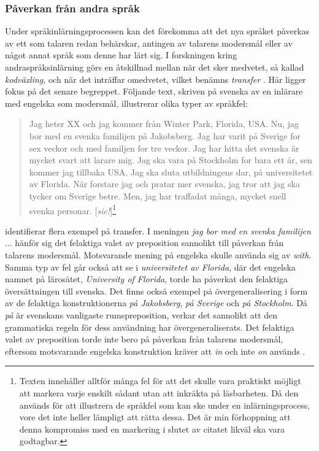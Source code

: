 \documentclass[12pt,a4paper]{article}
\begin{document}
\subsubsection{Påverkan från andra språk}
\label{subsec:Bakgrund: Språkfel: Påverkan från andra språk}
Under språkinlärningsprocessen kan det förekomma att det nya språket påverkas av ett som talaren redan behärskar, antingen av talarens modersmål eller av något annat språk som denne har lärt sig. I forskningen kring andraspråksinlärning görs en åtskillnad mellan när det sker medvetet, så kallad \emph{kodväxling}, och när det inträffar omedvetet, vilket benämns \emph{transfer} \autocite{viberg1987}. Här ligger fokus på det senare begreppet. Följande text, skriven på svenska av en inlärare med engelska som modersmål, illustrerar olika typer av språkfel:

\blockquote[{\cite[50]{viberg1987}}]{Jag heter XX och jag kommer från Winter Park, Florida, USA. Nu, jag bor med en svenka familijen på Jakobsberg. Jag har varit på Sverige for sex veckor och med familjen for tre veckor. Jag har hitta det svenska är mycket svart att larare mig. Jag ska vara på Stockholm for bara ett år, sen kommer jag tillbaka USA. Jag ska sluta utbildningens dar, på universitetet av Florida. När forstare jag och pratar mer svenska, jag tror att jag ska tycker om Sverige betre. Men, jag har traffadat många, mycket snell svenka personar. [\emph{sic!}]\footnote{Texten innehåller alltför många fel för att det skulle vara praktiskt möjligt att markera varje enskilt sådant utan att inkräkta på läsbarheten. Då den används för att illustrera de språkfel som kan ske under en inlärningsprocess, vore det inte heller lämpligt att rätta dessa. Det är min förhoppning att denna kompromiss med en markering i slutet av citatet likväl ska vara godtagbar.}}

\noindent
\textcite{viberg1987} identifierar flera exempel på transfer. I meningen \emph{jag bor med en svenka familijen} ... hänför sig det felaktiga valet av preposition sannolikt till påverkan från talarens modersmål. Motsvarande mening på engelska skulle använda sig av \emph{with}. Samma typ av fel går också att se i \emph{universitetet av Florida}, där det engelska namnet på lärosätet, \emph{University of Florida}, torde ha påverkat den felaktiga översättningen till svenska. Det finns också exempel på övergeneralisering i form av de felaktiga konstruktionerna \emph{på Jakobsberg}, \emph{på Sverige} och \emph{på Stockholm}. Då \emph{på} är svenskans vanligaste rumspreposition, verkar det sannolikt att den grammatiska regeln för dess användning har övergeneraliserats. Det felaktiga valet av preposition torde inte bero på påverkan från talarens modersmål, eftersom motsvarande engelska konstruktion kräver att \emph{in} och inte \emph{on} används \autocite{viberg1987}.
\end{document}
